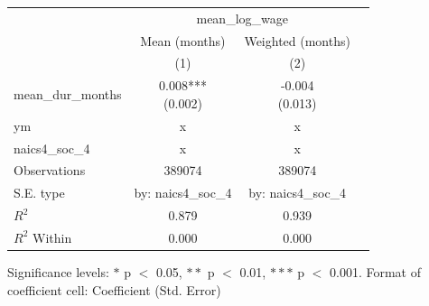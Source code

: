 \renewcommand\cellalign{t}
\begin{threeparttable}
\begin{tabular}{lccc}
\toprule
 & \multicolumn{2}{c}{mean_log_wage} \\
\cmidrule(lr){2-3} 
 & Mean (months) & Weighted (months) \\
 & (1) & (2) \\
\midrule
\addlinespace
mean_dur_months & \makecell{0.008*** \\ (0.002)} & \makecell{-0.004 \\ (0.013)} \\
\midrule
\addlinespace
ym & x & x \\
naics4_soc_4 & x & x \\
\midrule
\addlinespace
Observations & 389074 & 389074 \\
S.E. type & by: naics4_soc_4 & by: naics4_soc_4 \\
$R^2$ & 0.879 & 0.939 \\
$R^2$ Within & 0.000 & 0.000 \\
\bottomrule
\end{tabular}
\footnotesize Significance levels: $*$ p $<$ 0.05, $**$ p $<$ 0.01, $***$ p $<$ 0.001. Format of coefficient cell: Coefficient 
 (Std. Error)
\end{threeparttable}